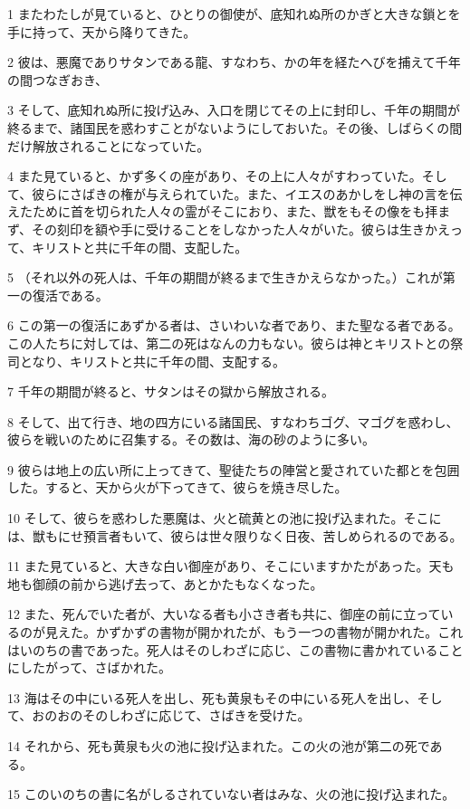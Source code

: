 \par 1 またわたしが見ていると、ひとりの御使が、底知れぬ所のかぎと大きな鎖とを手に持って、天から降りてきた。
\par 2 彼は、悪魔でありサタンである龍、すなわち、かの年を経たへびを捕えて千年の間つなぎおき、
\par 3 そして、底知れぬ所に投げ込み、入口を閉じてその上に封印し、千年の期間が終るまで、諸国民を惑わすことがないようにしておいた。その後、しばらくの間だけ解放されることになっていた。
\par 4 また見ていると、かず多くの座があり、その上に人々がすわっていた。そして、彼らにさばきの権が与えられていた。また、イエスのあかしをし神の言を伝えたために首を切られた人々の霊がそこにおり、また、獣をもその像をも拝まず、その刻印を額や手に受けることをしなかった人々がいた。彼らは生きかえって、キリストと共に千年の間、支配した。
\par 5 （それ以外の死人は、千年の期間が終るまで生きかえらなかった。）これが第一の復活である。
\par 6 この第一の復活にあずかる者は、さいわいな者であり、また聖なる者である。この人たちに対しては、第二の死はなんの力もない。彼らは神とキリストとの祭司となり、キリストと共に千年の間、支配する。
\par 7 千年の期間が終ると、サタンはその獄から解放される。
\par 8 そして、出て行き、地の四方にいる諸国民、すなわちゴグ、マゴグを惑わし、彼らを戦いのために召集する。その数は、海の砂のように多い。
\par 9 彼らは地上の広い所に上ってきて、聖徒たちの陣営と愛されていた都とを包囲した。すると、天から火が下ってきて、彼らを焼き尽した。
\par 10 そして、彼らを惑わした悪魔は、火と硫黄との池に投げ込まれた。そこには、獣もにせ預言者もいて、彼らは世々限りなく日夜、苦しめられるのである。
\par 11 また見ていると、大きな白い御座があり、そこにいますかたがあった。天も地も御顔の前から逃げ去って、あとかたもなくなった。
\par 12 また、死んでいた者が、大いなる者も小さき者も共に、御座の前に立っているのが見えた。かずかずの書物が開かれたが、もう一つの書物が開かれた。これはいのちの書であった。死人はそのしわざに応じ、この書物に書かれていることにしたがって、さばかれた。
\par 13 海はその中にいる死人を出し、死も黄泉もその中にいる死人を出し、そして、おのおのそのしわざに応じて、さばきを受けた。
\par 14 それから、死も黄泉も火の池に投げ込まれた。この火の池が第二の死である。
\par 15 このいのちの書に名がしるされていない者はみな、火の池に投げ込まれた。

